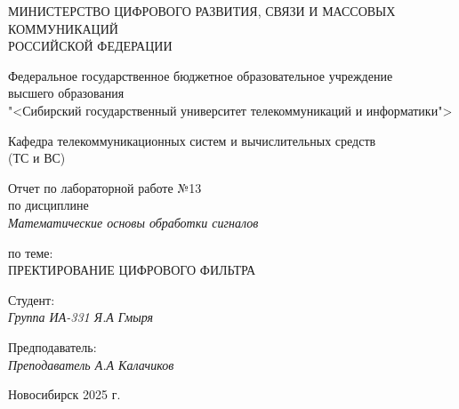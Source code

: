 \thispagestyle{empty}

\begin{center}
    МИНИСТЕРСТВО ЦИФРОВОГО РАЗВИТИЯ, СВЯЗИ И МАССОВЫХ КОММУНИКАЦИЙ \\ РОССИЙСКОЙ ФЕДЕРАЦИИ

    \vspace{20pt}

    Федеральное государственное бюджетное образовательное учреждение  \\  высшего образования \\
    "<Сибирский государственный университет телекоммуникаций и информатики"> \\

    \vspace{20pt}

    Кафедра телекоммуникационных систем и вычислительных средств \\  (ТС и ВС)
\end{center}

\vfill

\begin{center}
    Отчет по лабораторной работе №13 \\  
    по дисциплине \\
    \textit{Математические основы обработки сигналов}

    \vspace{20pt}

    по теме: \\
    \uppercase{Пректирование цифрового фильтра}
\end{center}

\vfill

    \noindent Студент: \\
    \textit{Группа ИА-331 \hfill Я.А Гмыря}

    \vspace{20pt}

    \noindent Предподаватель: \\
    \textit{Преподаватель \hfill А.А Калачиков}

\vfill

\begin{center}
    Новосибирск 2025 г.
\end{center}
